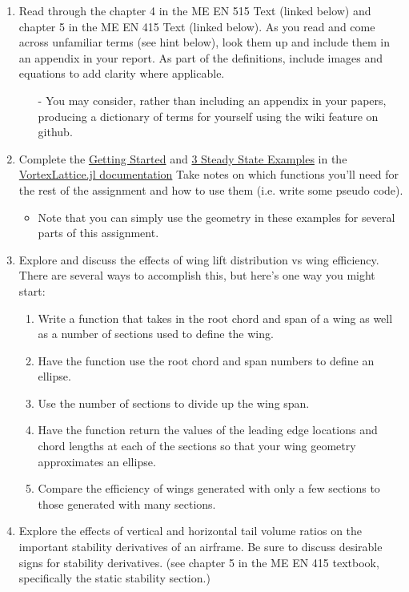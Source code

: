 \documentclass[12pt]{article}
\begin{document}
\begin{enumerate}
	\item Read  through the chapter 4 in the ME EN 515 Text (linked below) and chapter 5 in the ME EN 415 Text (linked below).  As you read and come across unfamiliar terms (see hint below), look them up and include them in an appendix in your report.  As part of the definitions, include images and equations to add clarity where applicable.
	\begin{itemize}
		\item[-] You may consider, rather than including an appendix in your papers, producing a dictionary of terms for yourself using the wiki feature on github.
	\end{itemize}
	\item Complete the \href{https://flow.byu.edu/VortexLattice.jl/stable/guide/}{Getting Started} and \href{https://flow.byu.edu/VortexLattice.jl/stable/examples/#Steady-State-Analysis-of-a-Wing}{3 Steady State Examples} in the \href{https://flow.byu.edu/VortexLattice.jl/stable/}{VortexLattice.jl documentation} Take notes on which functions you'll need for the rest of the assignment and how to use them (i.e. write some pseudo code). 
	\begin{itemize}
		\item Note that you can simply use the geometry in these examples for several parts of this assignment.
	\end{itemize}
	\item Explore and discuss the effects of wing lift distribution vs wing efficiency. There are several ways to accomplish this, but here's one way you might start:
	\begin{enumerate}
		\item Write a function that takes in the root chord and span of a wing as well as a number of sections used to define the wing.
		\item Have the function use the root chord and span numbers to define an ellipse.
		\item Use the number of sections to divide up the wing span.
		\item Have the function return the values of the leading edge locations and chord lengths at each of the sections so that your wing geometry approximates an ellipse.
		\item Compare the efficiency of wings generated with only a few sections to those generated with many sections. 
	\end{enumerate}
	\item Explore the effects of vertical and horizontal tail volume ratios on the important stability derivatives of an airframe. Be sure to discuss desirable signs for stability derivatives. (see chapter 5 in the ME EN 415 textbook, specifically the static stability section.)

\end{enumerate}
\end{document}
